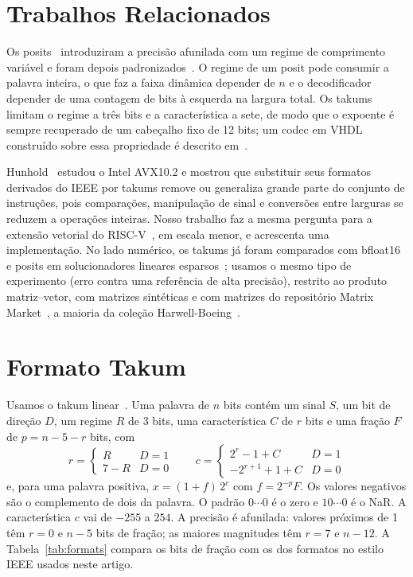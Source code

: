 \documentclass[conference]{IEEEtran}
\begin{document}
\section{Trabalhos Relacionados}

Os posits~\cite{gustafson2017} introduziram a precisão afunilada com um regime de comprimento variável e
foram depois padronizados~\cite{positstd}. O regime de um posit pode consumir a palavra inteira, o que faz
a faixa dinâmica depender de $n$ e o decodificador depender de uma contagem de bits à esquerda na largura
total. Os takums~\cite{hunhold2024takum} limitam o regime a três bits e a característica a sete, de modo
que o expoente é sempre recuperado de um cabeçalho fixo de 12 bits; um codec em VHDL construído sobre
essa propriedade é descrito em~\cite{hunhold2024codec}.

Hunhold~\cite{hunhold2025avx} estudou o Intel AVX10.2 e mostrou que substituir seus formatos derivados do
IEEE por takums remove ou generaliza grande parte do conjunto de instruções, pois comparações, manipulação
de sinal e conversões entre larguras se reduzem a operações inteiras. Nosso trabalho faz a mesma pergunta
para a extensão vetorial do RISC-V~\cite{rvv}, em escala menor, e acrescenta uma implementação. No lado
numérico, os takums já foram comparados com bfloat16 e posits em solucionadores lineares
esparsos~\cite{hunhold2025solvers}; usamos o mesmo tipo de experimento (erro contra uma referência de alta
precisão), restrito ao produto matriz--vetor, com matrizes sintéticas e com matrizes do
repositório Matrix Market~\cite{boisvert1997}, a maioria da coleção Harwell-Boeing~\cite{duff1989}.

\section{Formato Takum}

Usamos o takum linear~\cite{hunhold2024takum}. Uma palavra de $n$ bits contém um sinal $S$, um bit de
direção $D$, um regime $R$ de 3 bits, uma característica $C$ de $r$ bits e uma fração $F$ de $p=n-5-r$
bits, com
\begin{equation}
r=\begin{cases}R & D=1\\ 7-R & D=0\end{cases}\qquad
c=\begin{cases}2^{r}-1+C & D=1\\ -2^{r+1}+1+C & D=0\end{cases}
\end{equation}
e, para uma palavra positiva, $x=(1+f)\,2^{c}$ com $f=2^{-p}F$. Os valores negativos são o complemento de
dois da palavra. O padrão $0\cdots0$ é o zero e $10\cdots0$ é o NaR. A característica $c$ vai de $-255$ a
$254$. A precisão é afunilada: valores próximos de 1 têm $r=0$ e $n-5$ bits de fração; as maiores
magnitudes têm $r=7$ e $n-12$. A Tabela~\ref{tab:formats} compara os bits de fração com os dos formatos
no estilo IEEE usados neste artigo.
\end{document}
